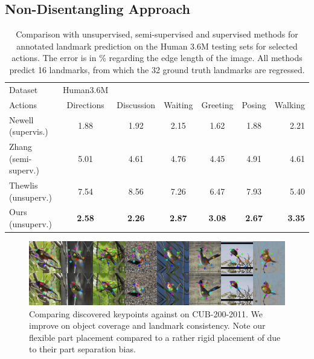 		\subsection{Non-Disentangling Approach}\label{sec:zhang}
			\begin{table}[!ht]
				\centering
				\begin{tabular}{l|cccccr}
				\hline
				Dataset & Human3.6M  &  &  & &  &  \\
				Actions &  {\footnotesize Directions} & {\footnotesize Discussion} &  {\footnotesize Waiting }& {\footnotesize Greeting }& {\footnotesize Posing} & {\footnotesize Walking} \\
				\hline
				Newell \cite{newell16hourglass} (supervis.) %
					& 1.88 & 1.92 & 2.15 & 1.62 & 1.88 & 2.21 \\
				Zhang \cite{zhang18}  (semi-superv.) %
					& 5.01 & 4.61 & 4.76 & 4.45 & 4.91 & 4.61 \\  \hline
				Thewlis \cite{thewlis17}  (unsuperv.) %
					& 7.54 & 8.56 & 7.26 & 6.47 & 7.93 & 5.40 \\
				Ours (unsuperv.) %
					& \textbf{2.58} & \textbf{2.26} & \textbf{2.87} & \textbf{3.08} & \textbf{2.67} & \textbf{3.35}\\
				\hline
				\end{tabular}
				\caption{{Comparison with unsupervised, semi-supervised and supervised methods for annotated landmark prediction on the Human 3.6M testing sets for selected actions. The
				error is in \% regarding the edge length of the image. All methods predict 16 landmarks, from which the 32 ground truth landmarks are regressed.}}
				\label{tab:humanactions}
			\end{table}

			\begin{figure}[htp]
				\centering
				\includegraphics[trim={0cm 0cm 0cm 0cm},clip, width=1.\linewidth]{fig/shape/comp}
				\caption{Comparing discovered keypoints against \cite{zhang18} on CUB-200-2011. We improve on object coverage and landmark consistency. Note our flexible part placement compared to a rather rigid placement of \cite{zhang18} due to their part separation bias.}
				\label{fig:compare}
			\end{figure}

